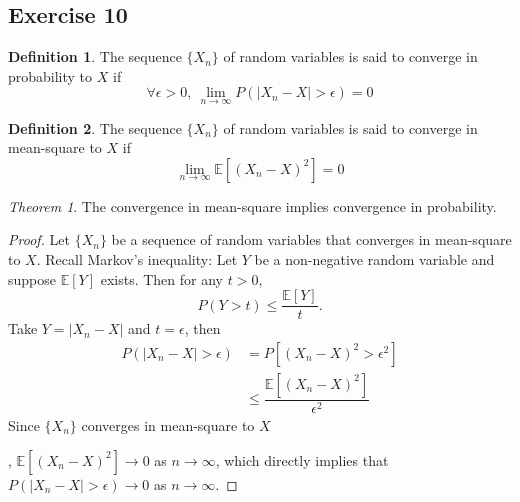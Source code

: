 \documentclass[11pt]{article}
\theoremstyle{definition}
\newtheorem{definition}{Definition}[section]
\theoremstyle{remark}
\theoremstyle{remark}
\newtheorem{theorem}{Theorem}[section]
\newcommand{\E}[1]{\mathbb{E}\left[#1 \right]}
\begin{document}
\subsection*{Exercise 10}
\begin{definition}
  The sequence $\{X_n\}$ of random variables is said to converge in
  probability to $X$ if
\[
\forall\epsilon>0, \ \lim_{n\rightarrow\infty}P\left(|X_n-X|>\epsilon\right)=0
\]
\end{definition}

\begin{definition}
  The sequence $\{X_n\}$ of random variables is said to converge in
  mean-square to $X$ if
\[
  \lim_{n\rightarrow\infty}\E{(X_n-X)^2}=0
\]
\end{definition}
\begin{theorem}
  The convergence in mean-square implies convergence in probability.
\end{theorem}

\begin{proof}
  Let $\{X_n\}$ be a sequence of random variables that converges in
  mean-square to $X$. Recall Markov's inequality: Let $Y$ be a
  non-negative random variable and suppose $\E{Y}$ exists. Then for
  any $t>0$,
\[
  P(Y>t) \leq \dfrac{\E{Y}}{t}.
\]
Take $Y=|X_n-X|$ and $t=\epsilon$, then
\[
\begin{split}
  P(|X_n-X|>\epsilon) &= P\left[(X_n-X)^2>\epsilon^2\right]\\
  & \leq \dfrac{\E{(X_n-X)^2}}{\epsilon^2}
\end{split}
\]
Since $\{X_n\}$ converges in mean-square to $X$

, $\E{(X_n-X)^2}\rightarrow0$ as $n\rightarrow\infty$, which directly
implies that $P(|X_n-X|>\epsilon)\rightarrow0$ as
$n\rightarrow\infty$.
\end{proof}
\end{document}
